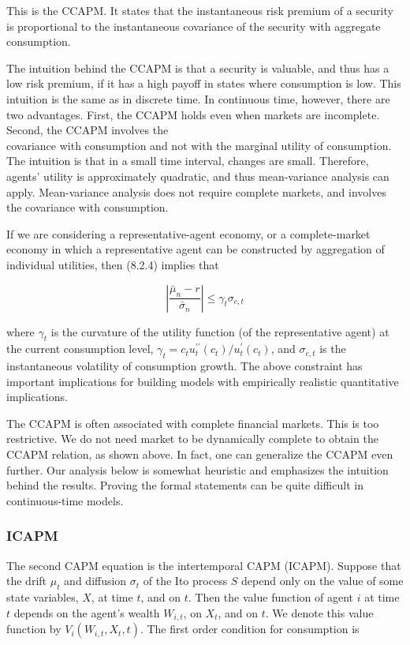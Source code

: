 \documentclass[\topdir/lecture\_notes.tex]{subfiles}
\begin{document}
This is the CCAPM. It states that the instantaneous risk premium of a security is proportional to the instantaneous covariance of the security with aggregate consumption.

The intuition behind the CCAPM is that a security is valuable, and thus has a low risk premium, if it has a high payoff in states where consumption is low. This intuition is the same as in discrete time. In continuous time, however, there are two advantages. First, the CCAPM holds even when markets are incomplete. Second, the CCAPM involves the\\
covariance with consumption and not with the marginal utility of consumption. The intuition is that in a small time interval, changes are small. Therefore, agents' utility is approximately quadratic, and thus mean-variance analysis can apply. Mean-variance analysis does not require complete markets, and involves the covariance with consumption.

If we are considering a representative-agent economy, or a complete-market economy in which a representative agent can be constructed by aggregation of individual utilities, then (8.2.4) implies that

\begin{equation}
\left|\frac{\bar{\mu}_{n}-r}{\bar{\sigma}_{n}}\right| \leq \gamma_{t} \sigma_{c, t}
\end{equation}

where $\gamma_{t}$ is the curvature of the utility function (of the representative agent) at the current consumption level, $\gamma_{t}=c_{t} u_{t}^{\prime \prime}\left(c_{t}\right) / u_{t}^{\prime}\left(c_{t}\right)$, and $\sigma_{c, t}$ is the instantaneous volatility of consumption growth. The above constraint has important implications for building models with empirically realistic quantitative implications.

The CCAPM is often associated with complete financial markets. This is too restrictive. We do not need market to be dynamically complete to obtain the CCAPM relation, as shown above. In fact, one can generalize the CCAPM even further. Our analysis below is somewhat heuristic and emphasizes the intuition behind the results. Proving the formal statements can be quite difficult in continuous-time models.


\subsubsection{ICAPM}
The second CAPM equation is the intertemporal CAPM (ICAPM). Suppose that the drift $\mu_{t}$ and diffusion $\sigma_{t}$ of the Ito process $S$ depend only on the value of some state variables, $X$, at time $t$, and on $t$. Then the value function of agent $i$ at time $t$ depends on the agent's wealth $W_{i, t}$, on $X_{t}$, and on $t$. We denote this value function by $V_{i}\left(W_{i, t}, X_{t}, t\right)$. The first order condition for consumption is
\end{document}
